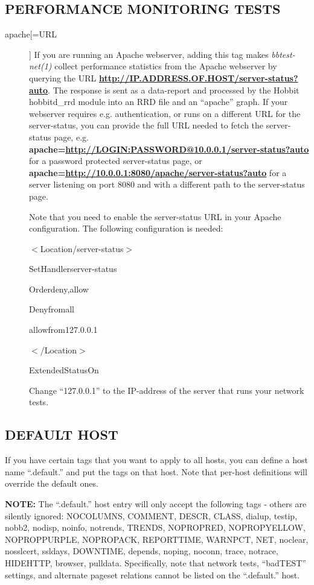 \subsection{PERFORMANCE MONITORING TESTS}
\begin{description}
\item[apache[=URL]] If you are running an Apache webserver, adding
  this tag makes \emph{bbtest-net(1)} collect performance statistics
  from the Apache webserver by querying the URL
  \textbf{\url{http://IP.ADDRESS.OF.HOST/server-status?auto}}. The
  response is sent as a data-report and processed by the Hobbit
  hobbitd\_rrd module into an RRD file and an ``apache'' graph. If
  your webserver requires e.g. authentication, or runs on a different
  URL for the server-status, you can provide the full URL needed to
  fetch the server-status page,
  e.g.
  \textbf{apache=\url{http://LOGIN:PASSWORD@10.0.0.1/server-status?auto}}
  for a password protected server-status page, or
  \textbf{apache=\url{http://10.0.0.1:8080/apache/server-status?auto}}
  for a server listening on port 8080 and with a different path to the
  server-status page. 



  Note that you need to enable the server-status URL in your Apache
  configuration. The following configuration is needed: 



  
$<$Location/server-status$>$  
 
SetHandlerserver-status  
 
Orderdeny,allow  
 
Denyfromall  
 
allowfrom127.0.0.1  
 
$<$/Location$>$  
 
ExtendedStatusOn 


  Change ``127.0.0.1'' to the IP-address of the server that runs your network tests. 


 


\end{description}
\subsection{DEFAULT HOST}
 If you have certain tags that you want to apply to all hosts, you can
 define a host name ``.default.'' and put the tags on that host. Note
 that per-host definitions will override the default ones. 


 \textbf{NOTE:}
 The ``.default.'' host entry will only accept the following tags -
 others are silently ignored: NOCOLUMNS, COMMENT, DESCR, CLASS,
 dialup, testip, nobb2, nodisp, noinfo, notrends, TRENDS, NOPROPRED,
 NOPROPYELLOW, NOPROPPURPLE, NOPROPACK, REPORTTIME, WARNPCT, NET,
 noclear, nosslcert, ssldays, DOWNTIME, depends, noping, noconn,
 trace, notrace, HIDEHTTP, browser, pulldata. Specifically, note that
 network tests, ``badTEST'' settings, and alternate pageset relations
 cannot be listed on the ``.default.'' host. 



